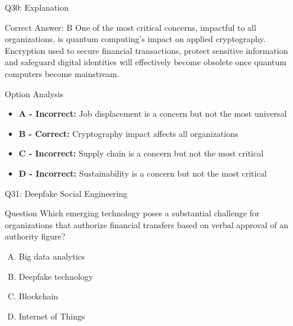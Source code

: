 \documentclass{beamer}
\begin{document}
	\begin{frame}{Q30: Explanation}
		\begin{block}{Correct Answer: B}
			One of the most critical concerns, impactful to all organizations, is quantum computing's impact on applied cryptography. Encryption used to secure financial transactions, protect sensitive information and safeguard digital identities will effectively become obsolete once quantum computers become mainstream.
		\end{block}
		\begin{block}{Option Analysis}
			\begin{itemize}
				\item \textbf{A - Incorrect:} Job displacement is a concern but not the most universal
				\item \textbf{B - Correct:} Cryptography impact affects all organizations
				\item \textbf{C - Incorrect:} Supply chain is a concern but not the most critical
				\item \textbf{D - Incorrect:} Sustainability is a concern but not the most critical
			\end{itemize}
		\end{block}
	\end{frame}
	
	\begin{frame}{Q31: Deepfake Social Engineering}
		\begin{block}{Question}
			Which emerging technology poses a substantial challenge for organizations that authorize financial transfers based on verbal approval of an authority figure?
		\end{block}
		\begin{enumerate}[(A)]
			\item Big data analytics
			\item Deepfake technology
			\item Blockchain
			\item Internet of Things
		\end{enumerate}
	\end{frame}
	
\end{document}
